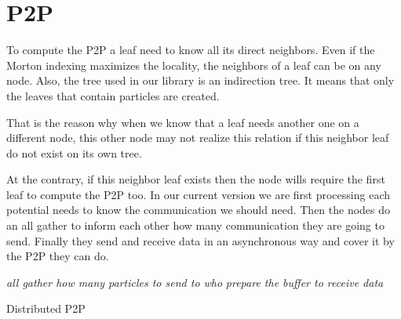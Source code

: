 \documentclass[12pt,letterpaper,titlepage]{report}
\begin{document}
\section{P2P}
To compute the P2P a leaf need to know all its direct neighbors.
Even if the Morton indexing maximizes the locality, the neighbors of a leaf can be on any node.
Also, the tree used in our library is an indirection tree.
It means that only the leaves that contain particles are created.

That is the reason why when we know that a leaf needs another one on a
different node, this other node may not realize this relation if this
neighbor leaf do not exist on its own tree.

At the contrary, if this neighbor leaf exists then the node wills require the first leaf to compute the P2P too.
In our current version we are first processing each potential needs to know the communication we should need.
Then the nodes do an all gather to inform each other how many communication they are going to send.
Finally they send and receive data in an asynchronous way and cover it by the P2P they can do.
\BlankLine
\begin{algorithm}[H]
  \LinesNumbered
  \SetAlgoLined
  \BlankLine
  \emph{all gather how many particles to send to who}\;
  \emph{prepare the buffer to receive data}\;
  \BlankLine
  \caption{Distributed P2P}
\end{algorithm}
\end{document}
